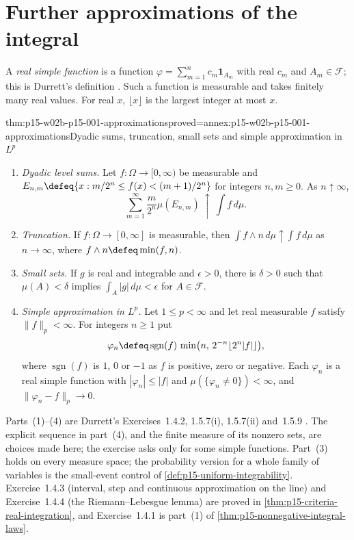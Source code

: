 \section{Further approximations of the integral}
\label{sec:p15-w02b-p15-001-approximation}

A \emph{real simple function} is a function
\(\varphi=\sum_{m=1}^nc_m\mathbf1_{A_m}\) with real \(c_m\) and
\(A_m\in\mathcal F\); this is Durrett's definition
\cite[Exercise~1.3.7, p.~17]{DurrettPTEAuthor2019}. Such a function is
measurable and takes finitely many real values. For real \(x\),
\(\lfloor x\rfloor\) is the largest integer at most \(x\).

\begin{hbtheorem}{thm:p15-w02b-p15-001-approximations}{proved=annex:p15-w02b-p15-001-approximations}{Dyadic sums, truncation, small sets and simple approximation in \(L^p\)}
\par\nobreak
\begin{enumerate}
\item \emph{Dyadic level sums.} Let \(f:\Omega\to[0,\infty)\) be
      measurable and
      \(E_{n,m}\defeq\{x:m/2^n\leq f(x)<(m+1)/2^n\}\) for integers
      \(n,m\geq0\). As \(n\uparrow\infty\),
      \[
       \sum_{m=1}^\infty\frac m{2^n}\mu(E_{n,m})\ \uparrow\ \int f\,d\mu.
      \]
\item \emph{Truncation.} If \(f:\Omega\to[0,\infty]\) is measurable,
      then \(\int f\wedge n\,d\mu\uparrow\int f\,d\mu\) as
      \(n\to\infty\), where \(f\wedge n\defeq\min(f,n)\).
\item \emph{Small sets.} If \(g\) is real and integrable and
      \(\epsilon>0\), there is \(\delta>0\) such that
      \(\mu(A)<\delta\) implies \(\int_A|g|\,d\mu<\epsilon\) for
      \(A\in\mathcal F\).
\item \emph{Simple approximation in \(L^p\).} Let \(1\leq p<\infty\)
      and let real measurable \(f\) satisfy \(\|f\|_p<\infty\). For
      integers \(n\geq1\) put
      \[
       \varphi_n\defeq\operatorname{sgn}(f)\,
         \min\bigl(n,\,2^{-n}\lfloor2^n|f|\rfloor\bigr),
      \]
      where \(\operatorname{sgn}(f)\) is \(1\), \(0\) or \(-1\) as
      \(f\) is positive, zero or negative. Each \(\varphi_n\) is a real
      simple function with \(|\varphi_n|\leq|f|\) and
      \(\mu(\{\varphi_n\neq0\})<\infty\), and
      \(\|\varphi_n-f\|_p\to0\).
\end{enumerate}
\end{hbtheorem}

Parts~(1)--(4) are Durrett's Exercises~1.4.2, 1.5.7(i), 1.5.7(ii)
and~1.5.9 \cite[pp.~24, 28]{DurrettPTEAuthor2019}. The explicit
sequence in part~(4), and the finite measure of its nonzero sets, are
choices made here; the exercise asks only for some simple functions.
Part~(3) holds on every measure space; the probability version for a
whole family of variables is the small-event control of
\cref{def:p15-uniform-integrability}. Exercise~1.4.3 (interval, step
and continuous approximation on the line) and Exercise~1.4.4 (the
Riemann--Lebesgue lemma) are proved in
\cref{thm:p15-criteria-real-integration}, and Exercise~1.4.1 is part~(1)
of \cref{thm:p15-nonnegative-integral-laws}.

